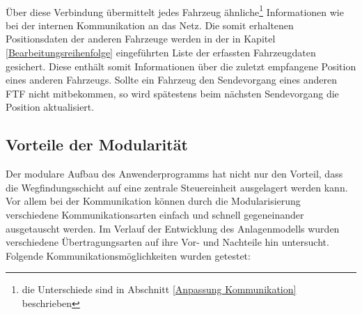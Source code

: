 		\\
		Über diese Verbindung übermittelt jedes Fahrzeug ähnliche\footnote{die Unterschiede sind in Abschnitt \ref{Anpassung Kommunikation} beschrieben} Informationen wie bei der internen Kommunikation an das Netz. Die somit erhaltenen Positionsdaten der anderen Fahrzeuge werden in der in Kapitel \ref{Bearbeitungsreihenfolge} eingeführten Liste der erfassten Fahrzeugdaten gesichert. Diese enthält somit Informationen über die zuletzt empfangene Position eines anderen Fahrzeugs. Sollte ein Fahrzeug den Sendevorgang eines anderen \ac{FTF} nicht mitbekommen, so wird spätestens beim nächsten Sendevorgang die Position aktualisiert.
		
	\subsection{Vorteile der Modularität}
		
		Der modulare Aufbau des Anwenderprogramms hat nicht nur den Vorteil, dass die Wegfindungsschicht auf eine zentrale Steuereinheit ausgelagert werden kann. Vor allem bei der Kommunikation können durch die Modularisierung verschiedene Kommunikationsarten einfach und schnell gegeneinander ausgetauscht werden. Im Verlauf der Entwicklung des Anlagenmodells wurden verschiedene Übertragungsarten auf ihre Vor- und Nachteile hin untersucht.
		Folgende Kommunikationsmöglichkeiten wurden getestet:
		
